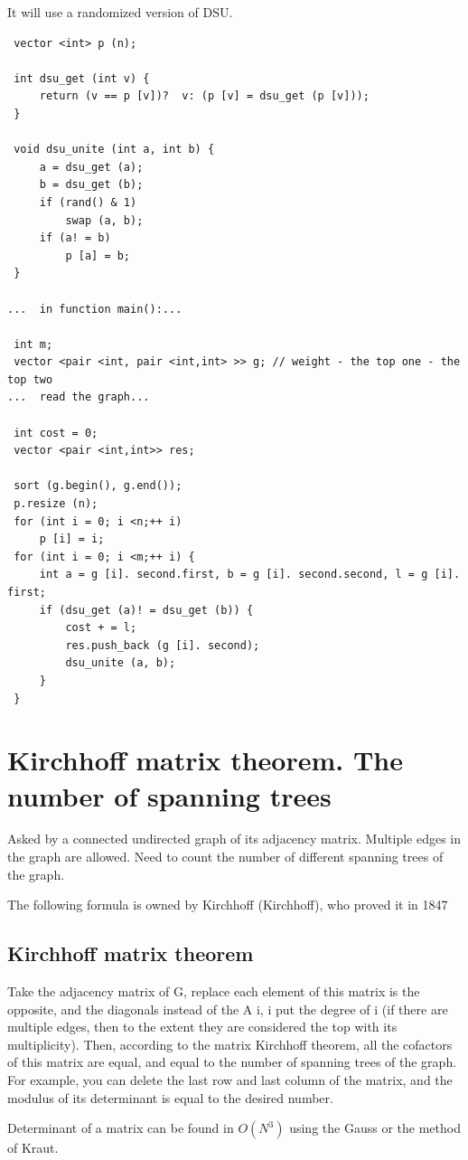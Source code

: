 It will use a randomized version of DSU.

\begin{verbatim}
 vector <int> p (n);

 int dsu_get (int v) {
     return (v == p [v])?  v: (p [v] = dsu_get (p [v]));
 }

 void dsu_unite (int a, int b) {
     a = dsu_get (a);
     b = dsu_get (b);
     if (rand() & 1)
         swap (a, b);
     if (a! = b)
         p [a] = b;
 }

...  in function main():...

 int m;
 vector <pair <int, pair <int,int> >> g; // weight - the top one - the top two
...  read the graph...

 int cost = 0;
 vector <pair <int,int>> res;

 sort (g.begin(), g.end());
 p.resize (n);
 for (int i = 0; i <n;++ i)
     p [i] = i;
 for (int i = 0; i <m;++ i) {
     int a = g [i]. second.first, b = g [i]. second.second, l = g [i]. first;
     if (dsu_get (a)! = dsu_get (b)) {
         cost + = l;
         res.push_back (g [i]. second);
         dsu_unite (a, b);
     }
 } 
\end{verbatim}
\section{ Kirchhoff matrix theorem. The number of spanning trees }
Asked by a connected undirected graph of its adjacency matrix. Multiple edges in the graph are allowed. Need to count the number of different spanning trees of the graph.

The following formula is owned by Kirchhoff (Kirchhoff), who proved it in 1847

\subsection{ Kirchhoff matrix theorem }
Take the adjacency matrix of G, replace each element of this matrix is the opposite, and the diagonals instead of the A i, i put the degree of i (if there are multiple edges, then to the extent they are considered the top with its multiplicity). Then, according to the matrix Kirchhoff theorem, all the cofactors of this matrix are equal, and equal to the number of spanning trees of the graph. For example, you can delete the last row and last column of the matrix, and the modulus of its determinant is equal to the desired number.

Determinant of a matrix can be found in $O(N^3)$ using the Gauss or the method of Kraut.

